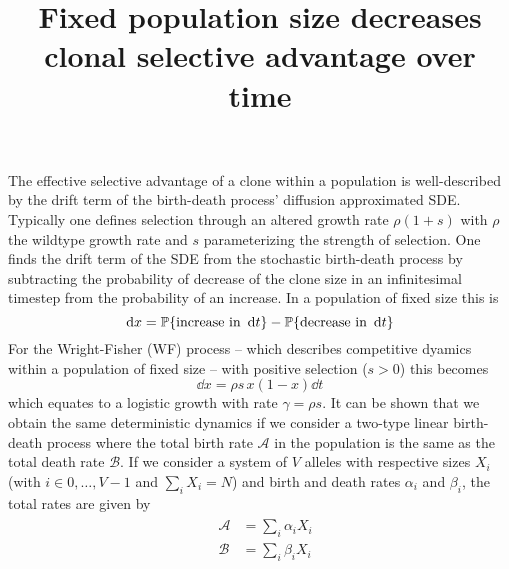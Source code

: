 \documentclass[pdftex,12pt,a4paper]{scrartcl}
\title{Fixed population size decreases clonal selective advantage over time}
\author{}
\begin{document}
 
The effective selective advantage of a clone within a population is well-described by the drift term of the birth-death process' diffusion approximated SDE. Typically one defines selection through an altered growth rate $\rho(1+s)$ with $\rho$ the wildtype growth rate and $s$ parameterizing the strength of selection. One finds the drift term of the SDE from the stochastic birth-death process by subtracting the probability of decrease of the clone size in an infinitesimal timestep from the probability of an increase. In a population of fixed size this is 
\begin{equation}
    \dd{x} = \mathbb{P}\qty{\text{increase in }\dd{t}} - \mathbb{P}\qty{\text{decrease in }\dd{t}}
\end{equation}
For the Wright-Fisher (WF) process -- which describes competitive dyamics within a population of fixed size -- with positive selection ($s>0$) this becomes
\begin{equation}
    \dd{x} = \rho s \, x(1-x) \dd{t}
\end{equation}
which equates to a logistic growth with rate $\gamma = \rho s$. It can be shown that we obtain the same deterministic dynamics if we consider a two-type linear birth-death process where the total birth rate $\mathcal{A}$ in the population is the same as the total death rate $\mathcal{B}$. If we consider a system of $V$ alleles with respective sizes $X_i$ (with $i \in 0,\dots,V-1$ and $\sum_i X_i = N$) and birth and death rates $\alpha_i$ and $\beta_i$, the total rates are given by
\begin{align*}
    &\begin{aligned}
        \mathcal{A} &= \sum_i \alpha_i X_i \\
        \mathcal{B} &= \sum_i \beta_i X_i
    \end{aligned}
\end{align*}
\end{document}
